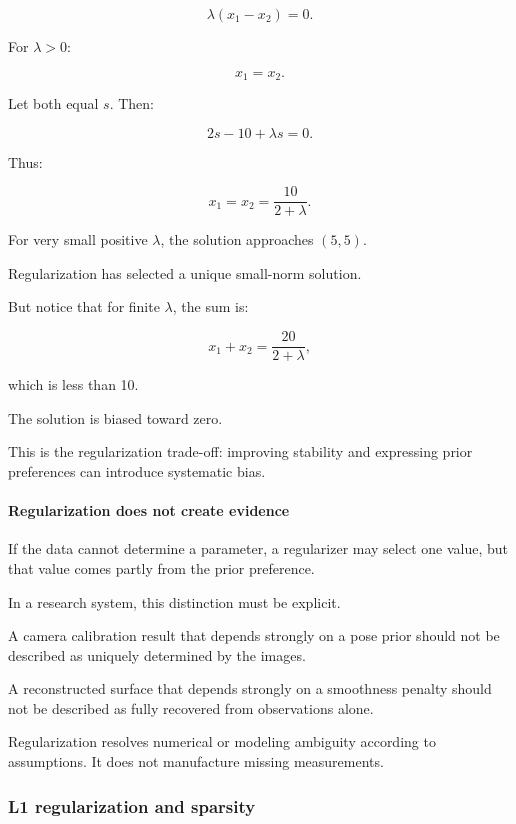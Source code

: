 \[
\lambda(x_1-x_2)=0.
\]

For \(\lambda>0\):

\[
x_1=x_2.
\]

Let both equal \(s\). Then:

\[
2s-10+\lambda s=0.
\]

Thus:

\[
\boxed{ x_1=x_2=\frac{10}{2+\lambda} }.
\]

For very small positive \(\lambda\), the solution approaches \((5,5)\).

Regularization has selected a unique small-norm solution.

But notice that for finite \(\lambda\), the sum is:

\[
x_1+x_2=\frac{20}{2+\lambda},
\]

which is less than 10.

The solution is biased toward zero.

This is the regularization trade-off: improving stability and expressing prior preferences can introduce systematic bias.

\paragraph{Regularization does not create evidence}\label{02-foundations-ii-ch027-regularization-does-not-create-evidence}

\hypertarget{02-foundations-ii-ch027-regularization-does-not-create-evidence}{}

If the data cannot determine a parameter, a regularizer may select one value, but that value comes partly from the prior preference.

In a research system, this distinction must be explicit.

A camera calibration result that depends strongly on a pose prior should not be described as uniquely determined by the images.

A reconstructed surface that depends strongly on a smoothness penalty should not be described as fully recovered from observations alone.

Regularization resolves numerical or modeling ambiguity according to assumptions. It does not manufacture missing measurements.

\subsubsection{L1 regularization and sparsity}\label{02-foundations-ii-ch027-l1-regularization-and-sparsity}

